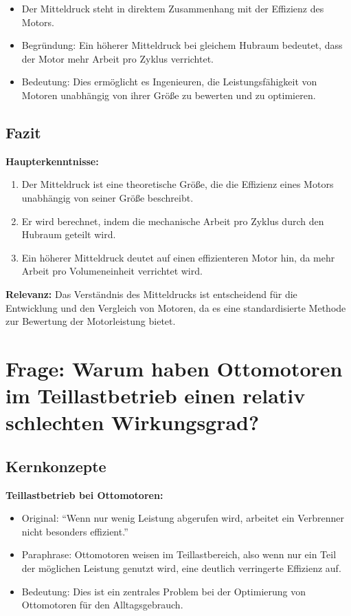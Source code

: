\documentclass[a4paper,12pt]{article}
\begin{document}
\begin{itemize}
    \item Der Mitteldruck steht in direktem Zusammenhang mit der Effizienz des Motors.
    \item Begründung: Ein höherer Mitteldruck bei gleichem Hubraum bedeutet, dass der Motor mehr Arbeit pro Zyklus verrichtet.
    \item Bedeutung: Dies ermöglicht es Ingenieuren, die Leistungsfähigkeit von Motoren unabhängig von ihrer Größe zu bewerten und zu optimieren.
\end{itemize}

\subsection{Fazit}

\textbf{Haupterkenntnisse:}

\begin{enumerate}
    \item Der Mitteldruck ist eine theoretische Größe, die die Effizienz eines Motors unabhängig von seiner Größe beschreibt.
    \item Er wird berechnet, indem die mechanische Arbeit pro Zyklus durch den Hubraum geteilt wird.
    \item Ein höherer Mitteldruck deutet auf einen effizienteren Motor hin, da mehr Arbeit pro Volumeneinheit verrichtet wird.
\end{enumerate}

\textbf{Relevanz:} Das Verständnis des Mitteldrucks ist entscheidend für die Entwicklung und den Vergleich von Motoren, da es eine standardisierte Methode zur Bewertung der Motorleistung bietet.

\section{Frage: Warum haben Ottomotoren im Teillastbetrieb einen relativ schlechten Wirkungsgrad?}

\subsection{Kernkonzepte}

\textbf{Teillastbetrieb bei Ottomotoren:}

\begin{itemize}
    \item Original: \enquote{Wenn nur wenig Leistung abgerufen wird, arbeitet ein Verbrenner nicht besonders effizient.}
    \item Paraphrase: Ottomotoren weisen im Teillastbereich, also wenn nur ein Teil der möglichen Leistung genutzt wird, eine deutlich verringerte Effizienz auf.
    \item Bedeutung: Dies ist ein zentrales Problem bei der Optimierung von Ottomotoren für den Alltagsgebrauch.
\end{itemize}
\end{document}
